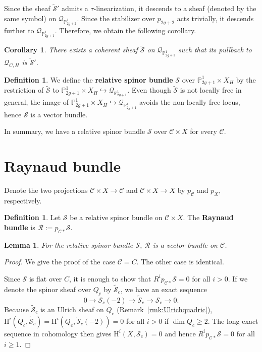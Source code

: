 \documentclass[12pt, letterpaper]{amsart}
\newtheorem{corollary}[theorem]{Corollary}
\newtheorem{lemma}[theorem]{Lemma}
\theoremstyle{definition}
\newtheorem{definition}[theorem]{Definition}
\newcommand{\PP}{\mathbb{P} }
\newcommand{\cC}{\mathcal{C} }
\newcommand{\cQ}{\mathcal{Q} }
\newcommand{\cR}{\mathcal{R} }
\newcommand{\cS}{\mathcal{S} }
\newcommand{\rH}{\mathrm{H} }
\newcommand{\tcS}{\widetilde{\cS} }
\begin{document}
Since the sheaf \(\tcS'\) admits a \(\tau\)-linearization, it descends to a sheaf (denoted by the same symbol) on \(\cQ_{\PP_{2g+2}^1}\). Since the stabilizer over \(p_{2g+2}\) acts trivially, it descends further to \(\cQ_{\PP_{2g+1}^1}\). Therefore, we obtain the following corollary.

\begin{corollary} \label{cor:descended_spinor_kernel}
There exists a coherent sheaf \(\tcS\) on \(\cQ_{\PP_{2g+1}^1}\) such that its pullback to \(\cQ_{C,H}\) is \(\tcS'\).
\end{corollary}

\begin{definition}\label{def:spinorbundleodd}
We define the \textbf{relative spinor bundle} \(\cS\) over \(\PP_{2g+1}^1 \times X_H\) by the restriction of \(\tcS\) to \(\PP_{2g+1}^1 \times X_H\hookrightarrow \cQ_{\PP_{2g+1}^1}\). Even though \(\tcS\) is not locally free in general, the image of \(\PP_{2g+1}^1 \times X_H \hookrightarrow \cQ_{\PP_{2g+1}^1}\) avoids the non-locally free locus, hence \(\cS\) is a vector bundle.
\end{definition}

In summary, we have a relative spinor bundle \(\cS\) over \(\cC \times X\) for every \(\cC\).

\section{Raynaud bundle}\label{sec:Raynaud}

Denote the two projections \(\cC \times X \to \cC\) and \(\cC \times X \to X\) by \(p_{\cC}\) and \(p_X\), respectively.

\begin{definition}\label{def:Raynaud}
Let \(\cS\) be a relative spinor bundle on \(\cC \times X\). The \textbf{Raynaud bundle} is \(\cR := p_{\cC*}\cS\).
\end{definition}

\begin{lemma}\label{lem:Rvb}
For the relative spinor bundle \(\cS\), \(\cR\) is a vector bundle on \(\cC\).
\end{lemma}

\begin{proof}
We give the proof of the case \(\cC = C\). The other case is identical.

Since \(\cS\) is flat over \(C\), it is enough to show that \(R^ip_{\cC*}\cS = 0\) for all \(i>0\). If we denote the spinor sheaf over \(Q_c\) by \(\widetilde{\cS}_c\), we have an exact sequence
\begin{equation}\label{eqn:spinor_hyperplane_exact}
0 \to \widetilde{\cS}_c(-2) \to \widetilde{\cS}_c \to \cS_c \to 0.
\end{equation}
Because \(\widetilde{\cS}_c\) is an Ulrich sheaf on \(Q_c\) (Remark~\ref{rmk:Ulrichquadric}), \(\rH^{i}(Q_c, \widetilde{\cS}_c)=\rH^{i}(Q_c, \widetilde{\cS}_c(-2)) = 0\) for all \(i > 0\) if \(\dim Q_c \geq 2\). The long exact sequence in cohomology then gives \(\rH^{i}(X, \cS_c)=0\) and hence \(R^ip_{\cC*}\cS = 0\) for all \(i \geq 1\).
\end{proof}
\end{document}
